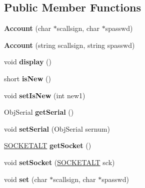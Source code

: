 \subsection*{Public Member Functions}
\begin{DoxyCompactItemize}
\item 
{\bfseries Account} (char $\ast$scallsign, char $\ast$spasswd)\hypertarget{classAccount_afa290b91d18c6c9f661a292ff77c7bde}{}\label{classAccount_afa290b91d18c6c9f661a292ff77c7bde}

\item 
{\bfseries Account} (string scallsign, string spasswd)\hypertarget{classAccount_ae2826dad6955d31b8c760633dc0d59f6}{}\label{classAccount_ae2826dad6955d31b8c760633dc0d59f6}

\item 
void {\bfseries display} ()\hypertarget{classAccount_a8c06d6472944250620d378f253e1ddc2}{}\label{classAccount_a8c06d6472944250620d378f253e1ddc2}

\item 
short {\bfseries is\+New} ()\hypertarget{classAccount_a737ff10ba79d624122d95b4e3fb87c14}{}\label{classAccount_a737ff10ba79d624122d95b4e3fb87c14}

\item 
void {\bfseries set\+Is\+New} (int new1)\hypertarget{classAccount_a572b5a2dfb1e3009e997ec5b9d12c623}{}\label{classAccount_a572b5a2dfb1e3009e997ec5b9d12c623}

\item 
Obj\+Serial {\bfseries get\+Serial} ()\hypertarget{classAccount_a6dea5a7c5301f8961c6d42b6989ba4a6}{}\label{classAccount_a6dea5a7c5301f8961c6d42b6989ba4a6}

\item 
void {\bfseries set\+Serial} (Obj\+Serial sernum)\hypertarget{classAccount_ad9e4761efb80300d87b70993b615c4f7}{}\label{classAccount_ad9e4761efb80300d87b70993b615c4f7}

\item 
\hyperlink{classSOCKETALT}{S\+O\+C\+K\+E\+T\+A\+LT} {\bfseries get\+Socket} ()\hypertarget{classAccount_a4cc8bca03e7af60534727869dbe22d5c}{}\label{classAccount_a4cc8bca03e7af60534727869dbe22d5c}

\item 
void {\bfseries set\+Socket} (\hyperlink{classSOCKETALT}{S\+O\+C\+K\+E\+T\+A\+LT} sck)\hypertarget{classAccount_a67946e2c30e3951b186f891ab30c1ffc}{}\label{classAccount_a67946e2c30e3951b186f891ab30c1ffc}

\item 
void {\bfseries set} (char $\ast$scallsign, char $\ast$spasswd)\hypertarget{classAccount_aee502d02abe842502cb4a657a549e9f1}{}\label{classAccount_aee502d02abe842502cb4a657a549e9f1}


\end{DoxyCompactItemize}
